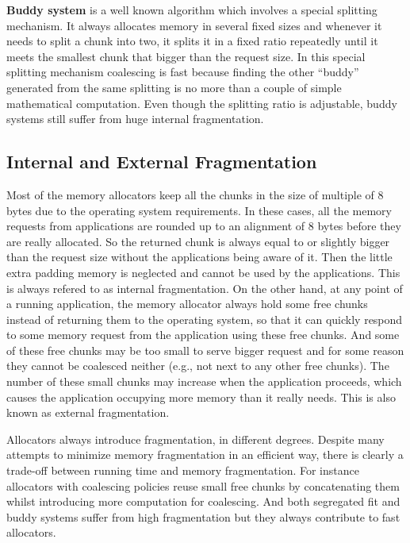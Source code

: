 \documentclass{acm_proc_article-sp}
\begin{document}
\textbf{Buddy system} is a well known algorithm which involves a special splitting mechanism. It always allocates memory in several fixed sizes and whenever it needs to split a chunk into two, it splits it in a fixed ratio repeatedly until it meets the smallest chunk that bigger than the request size. In this special splitting mechanism coalescing is fast because finding the other ``buddy'' generated from the same splitting is no more than a couple of simple mathematical computation. Even though the splitting ratio is adjustable, buddy systems still suffer from huge internal fragmentation.

\subsection{Internal and External Fragmentation}
\label{sec_fragmentation}
Most of the memory allocators keep all the chunks in the size of multiple of 8 bytes due to the operating system requirements. In these cases, all the memory requests from applications are rounded up to an alignment of 8 bytes before they are really allocated. So the returned chunk is always equal to or slightly bigger than the request size without the applications being aware of it. Then the little extra padding memory is neglected and cannot be used by the applications. This is always refered to as internal fragmentation. On the other hand, at any point of a running application, the memory allocator always hold some free chunks instead of returning them to the operating system, so that it can quickly respond to some memory request from the application using these free chunks. And some of these free chunks may be too small to serve bigger request and for some reason they cannot be coalesced neither (e.g., not next to any other free chunks). The number of these small chunks may increase when the application proceeds, which causes the application occupying more memory than it really needs. This is also known as external fragmentation. 

Allocators always introduce fragmentation, in different degrees. Despite many attempts to minimize memory fragmentation in an efficient way, there is clearly a trade-off between running time and memory fragmentation. For instance allocators with coalescing policies reuse small free chunks by concatenating them whilst introducing more computation for coalescing. And both segregated fit and buddy systems suffer from high fragmentation but they always contribute to fast allocators. 
\end{document}
